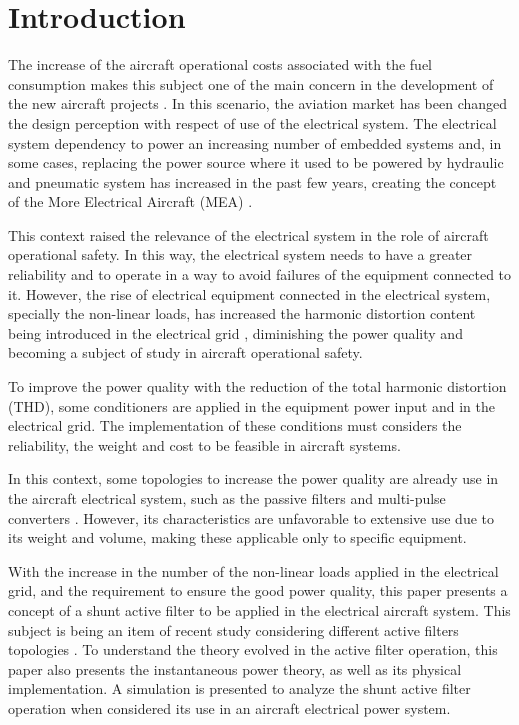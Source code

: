 \section{Introduction}

The increase of the aircraft operational costs associated with the fuel consumption makes this subject one of the main concern in the development of the new aircraft projects \citep{Babikian2002}. In this scenario, the aviation market has been changed the design perception with respect of use of the electrical system. The electrical system dependency to power an increasing number of embedded systems and, in some cases, replacing the power source where it used to be powered by hydraulic and pneumatic system has increased in the past few years, creating the concept of the More Electrical Aircraft (MEA) \citep{Moir1999}.

This context raised the relevance of the electrical system in the role of aircraft operational safety. In this way, the electrical system needs to have a greater reliability and to operate in a way to avoid failures of the equipment connected to it. However, the rise of electrical equipment connected in the electrical system, specially the non-linear loads, has increased the harmonic distortion content being introduced in the electrical grid \citep{Singer2012}, diminishing the power quality and becoming a subject of study in aircraft operational safety.

To improve the power quality with the reduction of the total harmonic distortion (THD), some conditioners are applied in the equipment power input and in the electrical grid. The implementation of these conditions must considers the reliability, the weight and cost to be feasible in aircraft systems.

In this context, some topologies to increase the power quality are already use in the aircraft electrical system, such as the passive filters and multi-pulse converters \citep{Zhu2014,Gong2003,Lobo2005}. However, its characteristics are unfavorable to extensive use due to its weight and volume, making these applicable only to specific equipment.

With the increase in the number of the non-linear loads applied in the electrical grid, and the requirement to ensure the good power quality, this paper presents a concept of a shunt active filter to be applied in the electrical aircraft system. This subject is being an item of recent study considering different active filters topologies \citep{Chen2012research,Chen2012novel,Chen2012control}. To understand the theory evolved in the active filter operation, this paper also presents the instantaneous power theory, as well as its physical implementation. A simulation is presented to analyze the shunt active filter operation when considered its use in an aircraft electrical power system.
